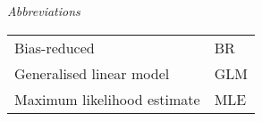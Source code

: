 \thispagestyle{plain}
\begin{center}
    \LARGE{\emph{Abbreviations}}
\end{center}
\vspace{1cm}
\begin{center}
	\begin{tabular}{ll}
		Bias-reduced & BR \\
		Generalised linear model & GLM \\
		Maximum likelihood estimate & MLE  \\
	\end{tabular}
\end{center}
